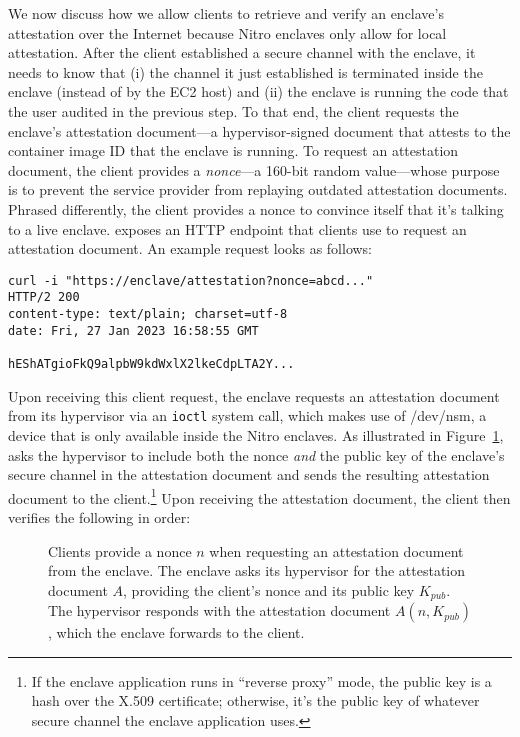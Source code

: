 We now discuss how we allow clients to retrieve and verify an enclave's
attestation over the Internet because Nitro enclaves only allow for local
attestation.  After the client established a secure channel with the enclave, it
needs to know that (i) the channel it just established is terminated
inside the enclave (instead of by the EC2 host) and (ii) the enclave is
running the code that the user audited in the previous step.  To that end, the
client requests the enclave's attestation document---a hypervisor-signed
document that attests to the container image ID that the enclave is running.
To request an attestation document, the client provides a \emph{nonce}---a
160-bit random value---whose purpose is to prevent the service provider from
replaying outdated attestation documents.  Phrased differently, the client
provides a nonce to convince itself that it's talking to a live enclave.
\Tool{} exposes an HTTP endpoint that clients use to request an attestation
document.  An example request looks as follows:

\begin{lstlisting}[numbers=none,basicstyle=\small\ttfamily]
curl -i "https://enclave/attestation?nonce=abcd..."
HTTP/2 200
content-type: text/plain; charset=utf-8
date: Fri, 27 Jan 2023 16:58:55 GMT

hEShATgioFkQ9alpbW9kdWxlX2lkeCdpLTA2Y...
\end{lstlisting}

Upon receiving this client request, the enclave requests an attestation document
from its hypervisor via an \texttt{ioctl} system call, which makes use of
/dev/nsm, a device that is only available inside the Nitro enclaves.  As
illustrated in Figure~\ref{fig:attestation}, \tool{} asks the hypervisor
to include both the nonce \emph{and} the public key of the enclave's secure
channel in the attestation document and sends the resulting attestation document
to the client.\footnote{If the enclave application runs in ``reverse proxy''
mode, the public key is a hash over the X.509 certificate; otherwise, it's the
public key of whatever secure channel the enclave application uses.}  Upon
receiving the attestation document, the client then verifies the following in
order:

\begin{figure}[t]
  \centering
  
  \caption{Clients provide a nonce $n$ when requesting an attestation document
  from the enclave.  The enclave asks its hypervisor for the attestation
  document $A$, providing the client's nonce and its public key $K_{pub}$.  The
  hypervisor responds with the attestation document $A(n, K_{pub})$, which the
  enclave forwards to the client.}%
  \label{fig:attestation}
\end{figure}

